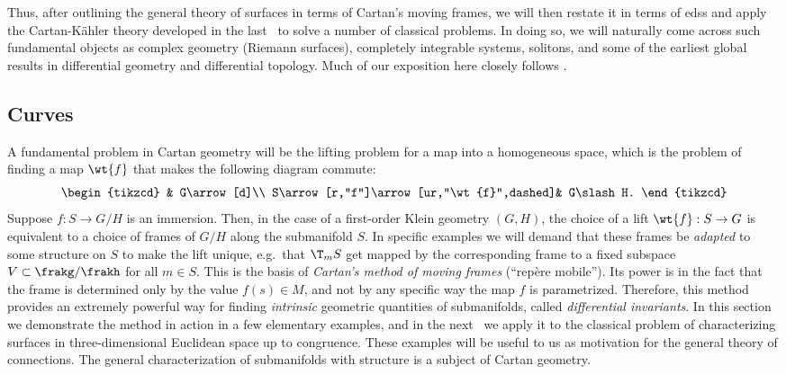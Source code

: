 Thus, after outlining the general theory of surfaces in terms of Cartan's moving frames, we will then restate it in terms of \glspl{eds} and apply the Cartan-K\"ahler theory developed in the last \sect\ to solve a number of classical problems. In doing so, we will naturally come across such fundamental objects as complex geometry (Riemann surfaces), completely integrable systems, solitons, and some of the earliest global results in differential geometry and differential topology. Much of our exposition here closely follows \cite{Ivey}.




\subsection{Curves}

A fundamental problem in Cartan geometry will be the lifting problem for a map into a homogeneous space, which is the problem of finding a map $\wt{f}$ that makes the following diagram commute:
\[\begin{tikzcd}
                                    & G\arrow[d]\\
    S\arrow[r,"f"]\arrow[ur,"\wt{f}",dashed]& G\slash H.
\end{tikzcd}\]
Suppose $f:S\to G\slash H$ is an immersion. Then, in the case of a first-order Klein geometry $(G,H)$, the choice of a lift $\wt{f}:S\to G$ is equivalent to a choice of frames of $G\slash H$ along the submanifold $S$. In specific examples we will demand that these frames be \emph{adapted} to some structure on $S$ to make the lift unique, e.g.\ that $\T_mS$ get mapped by the corresponding frame to a fixed subspace $V\subset \frakg\slash\frakh$ for all $m\in S$. This is the basis of \emph{Cartan's method of moving frames} (``rep\`ere mobile''). Its power is in the fact that the frame is determined only by the value $f(s)\in M$, and not by any specific way the map $f$ is parametrized. Therefore, this method provides an extremely powerful way for finding \emph{intrinsic} geometric quantities of submanifolds, called \emph{differential invariants}. In this section we demonstrate the method in action in a few elementary examples, and in the next \subsect\ we apply it to the classical problem of characterizing surfaces in three-dimensional Euclidean space up to congruence. These examples will be useful to us as motivation for the general theory of connections. The general characterization of submanifolds with structure is a subject of Cartan geometry.

